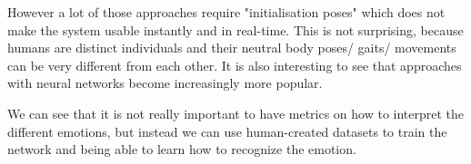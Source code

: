 \documentclass[conference]{IEEEtran}
\begin{document}
However a lot of those approaches require "initialisation poses"\cite{li2016emotion,cui2016emotion,mccoll2012affect,singh2015edbl} which does not make the system usable instantly and in real-time. This is not surprising, because humans are distinct individuals and their neutral body poses/ gaits/ movements can be very different from each other.
It is also interesting to see that approaches with neural networks become increasingly more popular. \

We can see that it is not really important to have metrics on how to interpret the different emotions, but instead we can use human-created datasets to train the network and being able to learn how to recognize the emotion.








%






\end{document}
